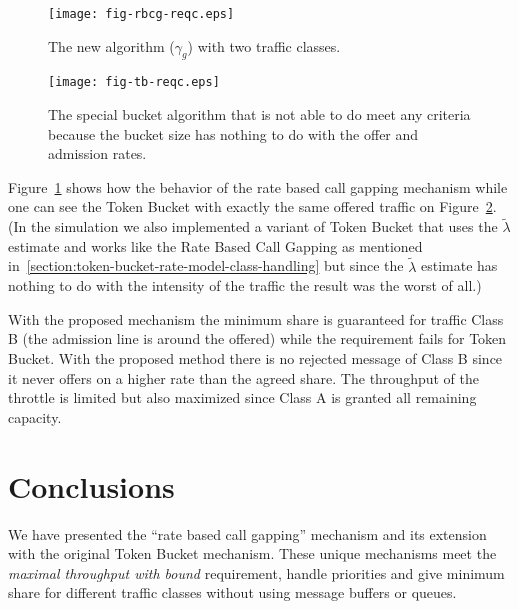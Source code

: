 \documentclass[conference]{IEEEtran}
\newcommand{\comment}[1]{}
\newcommand{\toinf}{\rightarrow~+\infty}
\newcommand{\tl}{\tilde{\lambda}}
\begin{document}
\begin{figure}[h]
\begin{center}
\texttt{[image: fig-rbcg-reqc.eps]}
\end{center}
\caption{The new algorithm ($\gamma_g$) with two traffic
classes.}\label{fig:rbcg-meets-reqc}
\end{figure}

\begin{figure}[h]
\begin{center}
\texttt{[image: fig-tb-reqc.eps]}
\end{center}
\caption{The special bucket algorithm that is not able to do meet
any criteria because the bucket size has nothing to do with the
offer and admission rates.}\label{fig:tb-not-meets-reqc}
\end{figure}

Figure~\ref{fig:rbcg-meets-reqc} shows how the behavior of the rate
based call gapping mechanism while one can see the Token Bucket with
exactly the same offered traffic on
Figure~\ref{fig:tb-not-meets-reqc}. (In the simulation we also
implemented a variant of Token Bucket that uses the $\tl$ estimate
and works like the Rate Based Call Gapping as mentioned
in~\ref{section:token-bucket-rate-model-class-handling} but since
the $\tl$ estimate has nothing to do with the intensity of the
traffic the result was the worst of all.)

With the proposed mechanism the minimum share is guaranteed for
traffic Class B (the admission line is around the offered) while the
requirement fails for Token Bucket. With the proposed method there
is no rejected message of Class B since it never offers on a higher
rate than the agreed share. The throughput of the throttle is
limited but also maximized since Class A is granted all remaining
capacity.

\comment{
\subsection{Smoothness}
In this section we show how the different settings of parameter $T$
(parameters $T_j$) affects the smoothness of the figures. As it was
already discussed the rate estimators are asymptotically unbiased as
$T\toinf$ meaning that large $T$ values makes the rate estimation
better and robust against variance. On the other hand small $T$
values have the benefit of reacting more intensively for traffic
rate changes.}

\section{Conclusions}
We have presented the ``rate based call gapping'' mechanism and its
extension with the original Token Bucket mechanism. These unique
mechanisms meet the \textit{maximal throughput with bound}
requirement, handle priorities and give minimum share for different
traffic classes without using message buffers or queues.
\end{document}
